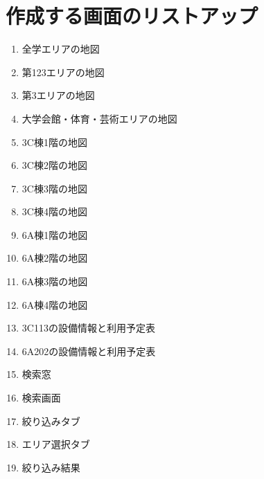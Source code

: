 \documentclass[12pt,a4paper,dvipdf]{jsarticle}
\begin{document}
\section{作成する画面のリストアップ}
\begin{enumerate}
    \item 全学エリアの地図
    \item 第123エリアの地図
    \item 第3エリアの地図
    \item 大学会館・体育・芸術エリアの地図
    \item 3C棟1階の地図
    \item 3C棟2階の地図
    \item 3C棟3階の地図
    \item 3C棟4階の地図
    \item 6A棟1階の地図
    \item 6A棟2階の地図
    \item 6A棟3階の地図
    \item 6A棟4階の地図
    \item 3C113の設備情報と利用予定表
    \item 6A202の設備情報と利用予定表
    \item 検索窓
    \item 検索画面
    \item 絞り込みタブ
    \item エリア選択タブ
    \item 絞り込み結果
\end{enumerate}

\newpage
\end{document}

